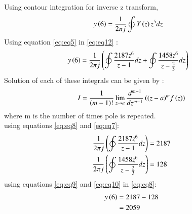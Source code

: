 \documentclass[journal,12pt,twocolumn]{IEEEtran}
\theoremstyle{remark}
\begin{document}
Using contour integration for inverse z transform,
\begin{align}
    y\left(6\right) &= \frac{1}{2\pi j}\oint Y\left(z\right) z^{5} dz \label{eq:eq12}
\end{align}
Using equation \eqref{eq:eq5} in \eqref{eq:eq12} :
\begin{align}
    &y\left(6\right)= \frac{1}{2\pi j}\left(\oint\frac{2187z^{6}}{z-1}dz + \oint\frac{1458z^{6}}{z - \frac{2}{3}} dz\right) \label{eq:eq8}
\end{align}
Solution of each of these integrals can be given by :
\begin{align}
    I =\frac{1}{\left(m-1\right)!}\lim\limits_{z\to a}\frac{d^{m-1}}{dz^{m-1}}\left({(z-a)}^{m}f\left(z\right)\right) \label{eq:eq7}
\end{align}
where m is the number of times pole is repeated.\\
using equations \eqref{eq:eq8} and \eqref{eq:eq7}:
\begin{align}
    \frac{1}{2\pi j}\left(\oint\frac{2187z^{6}}{z - 1}dz\right) &= 2187\label{eq:eq9}\\
     \frac{1}{2\pi j}\left(\oint\frac{1458z^{6}}{z - \frac{2}{3}}dz\right)  &= 128\label{eq:eq10}
     \end{align}
using equations \eqref{eq:eq9} and \eqref{eq:eq10} in \eqref{eq:eq8}:
\begin{align}
y\left(6\right) &= 2187 - 128\\
&= 2059
\end{align}
\end{document}
